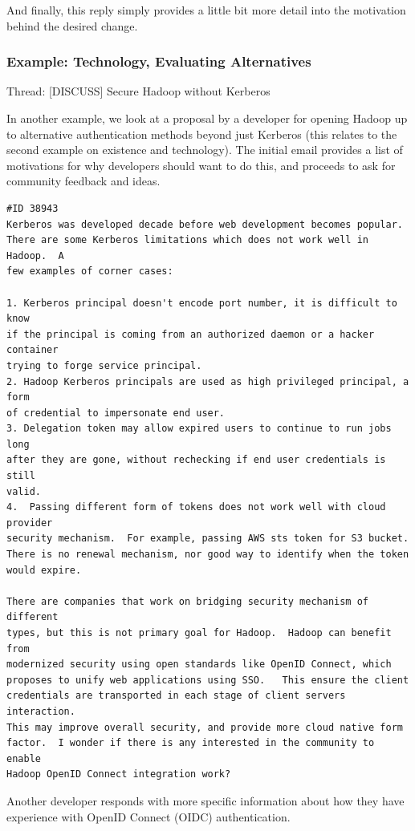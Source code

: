 \documentclass[a4paper, 12pt]{article}
\begin{document}
			And finally, this reply simply provides a little bit more detail into the motivation behind the desired change.
			
		\subsubsection{Example: Technology, Evaluating Alternatives}
			\footnotesize
				Thread: [DISCUSS] Secure Hadoop without Kerberos
			\normalsize
			
			In another example, we look at a proposal by a developer for opening Hadoop up to alternative authentication methods beyond just Kerberos (this relates to the second example on existence and technology). The initial email provides a list of motivations for why developers should want to do this, and proceeds to ask for community feedback and ideas.
			
			\begin{verbatim}
#ID 38943
Kerberos was developed decade before web development becomes popular.
There are some Kerberos limitations which does not work well in Hadoop.  A
few examples of corner cases:

1. Kerberos principal doesn't encode port number, it is difficult to know
if the principal is coming from an authorized daemon or a hacker container
trying to forge service principal.
2. Hadoop Kerberos principals are used as high privileged principal, a form
of credential to impersonate end user.
3. Delegation token may allow expired users to continue to run jobs long
after they are gone, without rechecking if end user credentials is still
valid.
4.  Passing different form of tokens does not work well with cloud provider
security mechanism.  For example, passing AWS sts token for S3 bucket.
There is no renewal mechanism, nor good way to identify when the token
would expire.

There are companies that work on bridging security mechanism of different
types, but this is not primary goal for Hadoop.  Hadoop can benefit from
modernized security using open standards like OpenID Connect, which
proposes to unify web applications using SSO.   This ensure the client
credentials are transported in each stage of client servers interaction.
This may improve overall security, and provide more cloud native form
factor.  I wonder if there is any interested in the community to enable
Hadoop OpenID Connect integration work?
			\end{verbatim}
		
			Another developer responds with more specific information about how they have experience with OpenID Connect (OIDC) authentication.
			
\end{document}
